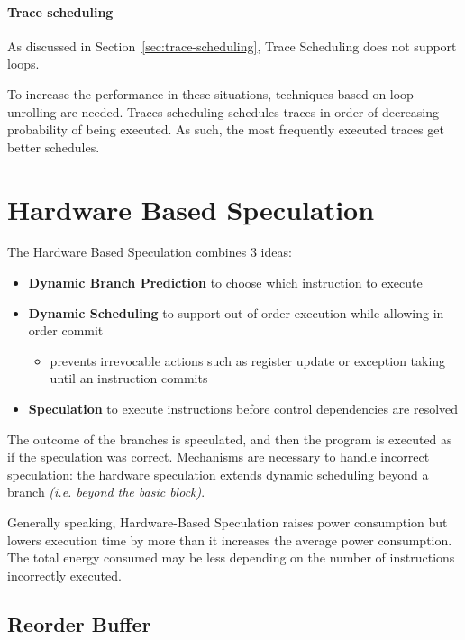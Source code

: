 \documentclass[english]{article}
\begin{document}
\paragraph{Trace scheduling}
\label{par:trace-scheduling}

As discussed in Section~\ref{sec:trace-scheduling}, Trace Scheduling does not support loops.

To increase the performance in these situations, techniques based on loop unrolling are needed.
Traces scheduling schedules traces in order of decreasing probability of being executed.
As such, the most frequently executed traces get better schedules.

\clearpage

\section{Hardware Based Speculation}

The Hardware Based Speculation combines \(3\) ideas:

\begin{itemize}
  \item \textbf{Dynamic Branch Prediction} to choose which instruction to execute
  \item \textbf{Dynamic Scheduling} to support out-of-order execution while allowing in-order commit
        \begin{itemize}
          \item prevents irrevocable actions such as register update or exception taking until an instruction commits
        \end{itemize}
  \item \textbf{Speculation} to execute instructions before control dependencies are resolved
\end{itemize}

The outcome of the branches is speculated, and then the program is executed as if the speculation was correct.
Mechanisms are necessary to handle incorrect speculation: the hardware speculation extends dynamic scheduling beyond a branch \textit{(i.e. beyond the basic block)}.

\bigskip
Generally speaking, Hardware-Based Speculation raises power consumption but lowers execution time by more than it increases the average power consumption.
The total energy consumed may be less depending on the number of instructions incorrectly executed.

\subsection{Reorder Buffer}
\end{document}
